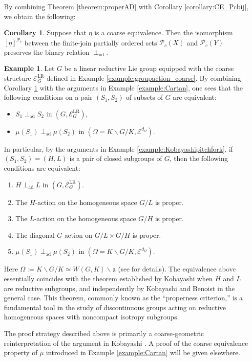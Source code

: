 \documentclass[12pt, a4paper]{amsart}
\theoremstyle{definition}
\newtheorem{corollary}[theorem]{Corollary}
\newtheorem{example}[theorem]{Example}
\newcommand{\adperp}{\mathrel{\perp_{\mathrm{ad}}}}
\begin{document}
By combining Theorem \ref{theorem:properAD} with Corollary \ref{corollary:CE_Pcbij}, we obtain the following:

\begin{corollary}\label{corollary:CE_adperp}
Suppose that $\eta$ is a coarse equivalence. Then the isomorphism $[\eta]^{\mathcal{P}_c}$ between the finite-join partially ordered sets $\mathcal{P}_c(X)$ and $\mathcal{P}_c(Y)$ preserves the binary relation $\adperp$.
\end{corollary}

\begin{example}
Let $G$ be a linear reductive Lie group equipped with the coarse structure $\mathcal{E}^{\mathrm{LR}}_G$ defined in Example \ref{example:groupaction_coarse}. By combining Corollary \ref{corollary:CE_adperp} with the arguments in Example \ref{example:Cartan}, one sees that the following conditions on a pair $(S_1,S_2)$ of subsets of $G$ are equivalent:
\begin{itemize}
    \item $S_1 \adperp S_2$ in $(G,\mathcal{E}^{\mathrm{LR}}_G)$,
    \item $\mu(S_1) \adperp \mu(S_2)$ in $(\Omega = K \backslash G/K,\mathcal{E}^{d_{\Omega}})$.
\end{itemize}

In particular, by the arguments in Example \ref{example:Kobayashipitchfork}, if $(S_1,S_2)=(H,L)$ is a pair of closed subgroups of $G$, then the following conditions are equivalent:
\begin{enumerate}
    \item $H \adperp L$ in $(G,\mathcal{E}^{\mathrm{LR}}_G)$.
    \item The $H$-action on the homogeneous space $G/L$ is proper.
    \item The $L$-action on the homogeneous space $G/H$ is proper.
    \item The diagonal $G$-action on $G/L \times G/H$ is proper.
    \item $\mu(S_1) \adperp \mu(S_2)$ in $(\Omega = K \backslash G/K,\mathcal{E}^{d_{\Omega}})$.
\end{enumerate}

Here $\Omega := K \backslash G/K \simeq W(G,K)\backslash \mathfrak{a}$ (see \cite[Section 6]{OgawaOkuda2025Kob60} for details). The equivalence above essentially coincides with the theorem established by Kobayashi \cite{Kobayashi89} when $H$ and $L$ are reductive subgroups, and independently by Kobayashi \cite{Kobayashi96} and Benoist \cite{Benoist96} in the general case. This theorem, commonly known as the ``properness criterion,'' is a fundamental tool in the study of discontinuous groups acting on reductive homogeneous spaces with noncompact isotropy subgroups.

The proof strategy described above is primarily a coarse-geometric reinterpretation of the argument in Kobayashi \cite{Kobayashi96}. A proof of the coarse equivalence property of $\mu$ introduced in Example \ref{example:Cartan} will be given elsewhere.
\end{example}
\end{document}
